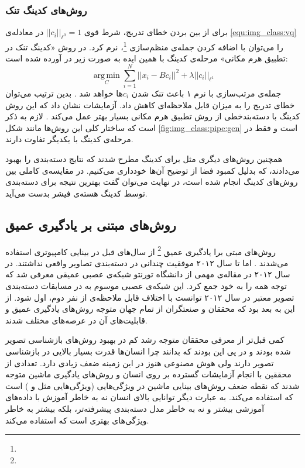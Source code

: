 \documentclass[11pt]{article}
\begin{document}
\subsubsection{روش‌های کدینگ تنک}
برای از بین بردن خطای تدریج، شرط قوی
$|| c_i ||_{\ell^0} = 1$
در معادله‌ی
\ref{equ:img_class:vq}
را می‌توان با اضافه کردن جمله‌ی منظم‌سازی
\footnote{}،
نرم کرد. در روش «کدینگ تنک در تطبیق هرم مکانی»
\cite{scspm}
مرحله‌ی کدینگ با همین ایده به صورت زیر در آورده شده است:
\begin{equation}
	\operatorname*{arg\,min}_C \sum_{i=1}^{N} || x_i - B c_i ||^2  + \lambda || c_i ||_{\ell ^ 1}
	\label{equ:img_class:sc}
\end{equation}
جمله‌ی مرتب‌سازی با نرم ۱ باعث تنک شدن $c_i$ها خواهد شد
\cite{sc}.
بدین ترتیب می‌توان خطای تدریج را به میزان قابل ملاحظه‌ای کاهش داد. آزمایشات نشان داد که این روش کدینگ با دسته‌بندخطی از روش تطبیق هرم مکانی بسیار بهتر عمل می‌کند
\cite{scspm}.
لازم به ذکر است که ساختار کلی این روش‌ها مانند شکل
\ref{fig:img_class:pipe:gen}
است و فقط در مرحله‌ی کدینگ با یکدیگر تفاوت دارند.

همچنین روش‌های دیگری مثل
\cite{llc, fisher_kernel, fisher_kernel_im}
برای کدینگ مطرح شدند که نتایج دسته‌بندی را بهبود می‌دادند، که بدلیل کمبود فضا از توضیح آن‌ها خودداری می‌کنیم. در
\cite{devil_coding}
مقایسه‌ی کاملی بین روش‌های کدینگ انجام شده است، در نهایت می‌توان گفت بهترین نتیجه برای دسته‌بندی توسط کدینگ هسته‌ی فیشر
\cite{fisher_kernel_im}
بدست می‌آید.
\subsection{روش‌های مبتنی بر یادگیری عمیق}\label{sec:img_class:dl}
روش‌های مبتی برا یادگیری عمیق
\footnote{}
از سال‌های قبل در بینایی کامپیوتری استفاده می‌شدند
\cite{lenet}.
اما تا سال ۲۰۱۲ موفقیت چندانی در دسته‌بندی تصاویر واقعی نداشتند. در سال ۲۰۱۲ در مقاله‌ی مهمی از دانشگاه تورنتو
\cite{alexnet}
شبکه‌ی عصبی عمیقی معرفی شد که توجه همه را به خود جمع کرد. این شبکه‌ی عصبی موسوم به
در مسابقات دسته‌بندی تصویر معتبر
\cite{ilsvrc}
در سال ۲۰۱۲ توانست با اختلاف قابل ملاحظه‌ی از نفر دوم، اول شود. از این به بعد بود که محققان و صنعتگران از تمام جهان متوجه روش‌های یادگیری عمیق و قابلیت‌های آن در عرصه‌های مختلف شدند.

کمی قبل‌تر از معرفی
محققان متوجه رشد کم در بهبود روش‌های بازشناسی تصویر شده بودند و در پی این بودند که بدانند چرا انسان‌ها قدرت بسیار بالایی در بازشناسی تصویر دارند ولی هوش‌ مصنوعی هنوز در این زمینه ضعف زیادی دارد. تعدادی از محققین با انجام آزمایشات گسترده بر روی انسان و روش‌های یادگیری ماشین متوجه شدند
\cite{parikh2010}
که نقطه ضعف روش‌های بینایی ماشین در ویژگی‌هایی (ویژگی‌هایی مثل
 \cite{sift} و  \cite{hog})
است که استفاده می‌کند. به عبارت دیگر توانایی بالای انسان نه به خاطر آموزش با داده‌های آموزشی بیشتر و نه به خاطر مدل دسته‌بندی پیشرفته‌تر، بلکه بیشتر به خاطر ویژگی‌های بهتری است که استفاده می‌کند.
\end{document}
